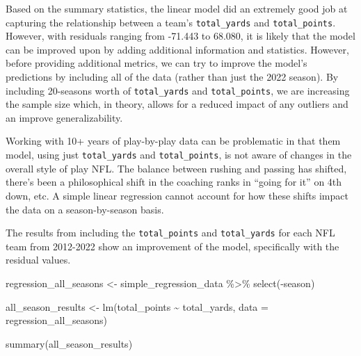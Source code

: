 \documentclass[
  letterpaper,
]{krantz}
\newenvironment{Shaded}{\begin{snugshade}}{\end{snugshade}}
\newcommand{\AttributeTok}[1]{\textcolor[rgb]{0.40,0.45,0.13}{#1}}
\newcommand{\FunctionTok}[1]{\textcolor[rgb]{0.28,0.35,0.67}{#1}}
\newcommand{\NormalTok}[1]{\textcolor[rgb]{0.00,0.23,0.31}{#1}}
\newcommand{\OtherTok}[1]{\textcolor[rgb]{0.00,0.23,0.31}{#1}}
\newcommand{\SpecialCharTok}[1]{\textcolor[rgb]{0.37,0.37,0.37}{#1}}
\begin{document}
Based on the summary statistics, the linear model did an extremely good
job at capturing the relationship between a team's \texttt{total\_yards}
and \texttt{total\_points}. However, with residuals ranging from -71.443
to 68.080, it is likely that the model can be improved upon by adding
additional information and statistics. However, before providing
additional metrics, we can try to improve the model's predictions by
including all of the data (rather than just the 2022 season). By
including 20-seasons worth of \texttt{total\_yards} and
\texttt{total\_points}, we are increasing the sample size which, in
theory, allows for a reduced impact of any outliers and an improve
generalizability.

\begin{tcolorbox}[enhanced jigsaw, colback=white, leftrule=.75mm, breakable, colframe=quarto-callout-important-color-frame, bottomtitle=1mm, rightrule=.15mm, left=2mm, opacityback=0, bottomrule=.15mm, arc=.35mm, coltitle=black, colbacktitle=quarto-callout-important-color!10!white, toptitle=1mm, titlerule=0mm, title=\textcolor{quarto-callout-important-color}{\faExclamation}\hspace{0.5em}{Important}, toprule=.15mm, opacitybacktitle=0.6]

Working with 10+ years of play-by-play data can be problematic in that
them model, using just \texttt{total\_yards} and \texttt{total\_points},
is not aware of changes in the overall style of play NFL. The balance
between rushing and passing has shifted, there's been a philosophical
shift in the coaching ranks in ``going for it'' on 4th down, etc. A
simple linear regression cannot account for how these shifts impact the
data on a season-by-season basis.

\end{tcolorbox}

The results from including the \texttt{total\_points} and
\texttt{total\_yards} for each NFL team from 2012-2022 show an
improvement of the model, specifically with the residual values.

\begin{Shaded}
\begin{Highlighting}[]
\NormalTok{regression\_all\_seasons }\OtherTok{\textless{}{-}}\NormalTok{ simple\_regression\_data }\SpecialCharTok{\%\textgreater{}\%}
  \FunctionTok{select}\NormalTok{(}\SpecialCharTok{{-}}\NormalTok{season)}

\NormalTok{all\_season\_results }\OtherTok{\textless{}{-}} \FunctionTok{lm}\NormalTok{(total\_points }\SpecialCharTok{\textasciitilde{}}\NormalTok{ total\_yards,}
                         \AttributeTok{data =}\NormalTok{ regression\_all\_seasons)}

\FunctionTok{summary}\NormalTok{(all\_season\_results)}
\end{Highlighting}
\end{Shaded}
\end{document}
